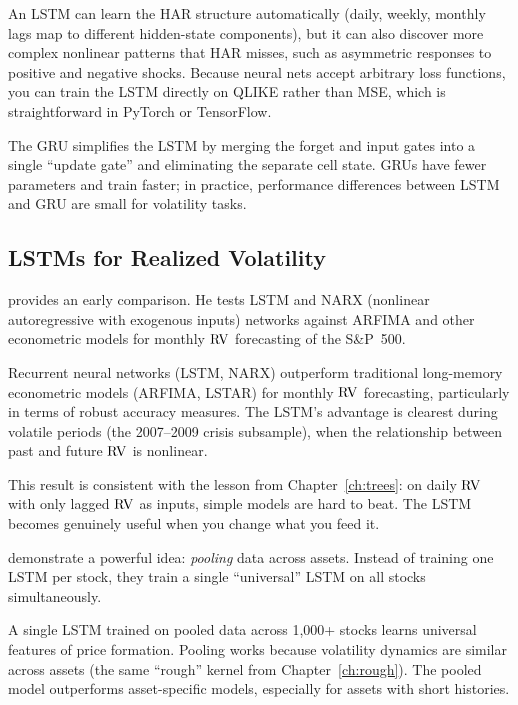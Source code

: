 \begin{projectconnection}
An LSTM can learn the HAR structure automatically (daily, weekly, monthly lags map to different hidden-state components), but it can also discover more complex nonlinear patterns that HAR misses, such as asymmetric responses to positive and negative shocks.
Because neural nets accept arbitrary loss functions, you can train the LSTM directly on QLIKE rather than MSE, which is straightforward in PyTorch or TensorFlow.
\end{projectconnection}

The GRU simplifies the LSTM by merging the forget and input gates into a single ``update gate'' and eliminating the separate cell state.
GRUs have fewer parameters and train faster; in practice, performance differences between LSTM and GRU are small for volatility tasks.

\subsection{LSTMs for Realized Volatility}

\citet{Bucci2020} provides an early comparison.
He tests LSTM and NARX (nonlinear autoregressive with exogenous inputs) networks against ARFIMA and other econometric models for monthly $\operatorname{RV}$ forecasting of the S\&P~500.

\begin{keyresult}
Recurrent neural networks (LSTM, NARX) outperform traditional long-memory econometric models (ARFIMA, LSTAR) for monthly $\operatorname{RV}$ forecasting, particularly in terms of robust accuracy measures.
The LSTM's advantage is clearest during volatile periods (the 2007--2009 crisis subsample), when the relationship between past and future $\operatorname{RV}$ is nonlinear.
\end{keyresult}

This result is consistent with the lesson from Chapter~\ref{ch:trees}: on daily $\operatorname{RV}$ with only lagged $\operatorname{RV}$ as inputs, simple models are hard to beat.
The LSTM becomes genuinely useful when you change what you feed it.

\citet{SirignanoCont2019} demonstrate a powerful idea: \emph{pooling} data across assets.
Instead of training one LSTM per stock, they train a single ``universal'' LSTM on all stocks simultaneously.

\begin{keyresult}
A single LSTM trained on pooled data across 1,000+ stocks learns universal features of price formation.
Pooling works because volatility dynamics are similar across assets (the same ``rough'' kernel from Chapter~\ref{ch:rough}).
The pooled model outperforms asset-specific models, especially for assets with short histories.
\end{keyresult}

